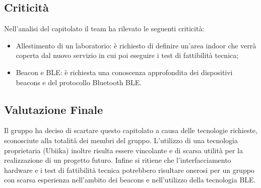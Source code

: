   
\subsection{Criticità}
Nell'analisi del capitolato il team ha rilevato le seguenti criticità:
\begin{itemize} 
\item Allestimento di un laboratorio: è richiesto di definire un'area indoor che verrà coperta dal nuovo servizio in cui poi eseguire i test di fattibilità tecnica;
\item Beacon e BLE: è richiesta una conoscenza approfondita dei dispositivi beacons e del protocollo Bluetooth BLE.
\end{itemize}


\subsection{Valutazione Finale}
Il gruppo ha deciso di scartare questo capitolato a causa delle tecnologie richieste, sconosciute alla totalità dei membri del gruppo. L'utilizzo di una tecnologia proprietaria (Ubiika) inoltre risulta essere vincolante e di scarsa utilità per la realizzazione di un progetto futuro. Infine si ritiene che l'interfacciamento hardware e i test di fattibilità tecnica potrebbero risultare onerosi per un gruppo con scarsa esperienza nell'ambito dei beacons e nell'utilizzo della tecnologia BLE.  

